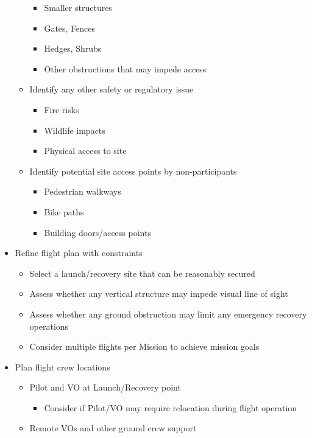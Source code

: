 \documentclass[
  12pt,
]{book}
\providecommand{\tightlist}{%
  \setlength{\itemsep}{0pt}\setlength{\parskip}{0pt}}
\begin{document}
\begin{itemize}
\begin{itemize}
    \begin{itemize}
    \tightlist
    \item
      Smaller structures
    \item
      Gates, Fences
    \item
      Hedges, Shrubs
    \item
      Other obstructions that may impede access
    \end{itemize}
  \item
    Identify any other safety or regulatory issue

    \begin{itemize}
    \tightlist
    \item
      Fire risks
    \item
      Wildlife impacts
    \item
      Physical access to site
    \end{itemize}
  \item
    Identify potential site access points by non-participants

    \begin{itemize}
    \tightlist
    \item
      Pedestrian walkways
    \item
      Bike paths
    \item
      Building doors/access points
    \end{itemize}
  \end{itemize}
\item
  Refine flight plan with constraints

  \begin{itemize}
  \tightlist
  \item
    Select a launch/recovery site that can be reasonably secured
  \item
    Assess whether any vertical structure may impede visual line of sight
  \item
    Assess whether any ground obstruction may limit any emergency recovery operations
  \item
    Consider multiple flights per Mission to achieve mission goals
  \end{itemize}
\item
  Plan flight crew locations

  \begin{itemize}
  \tightlist
  \item
    Pilot and VO at Launch/Recovery point

    \begin{itemize}
    \tightlist
    \item
      Consider if Pilot/VO may require relocation during flight operation
    \end{itemize}
  \item
    Remote VOs and other ground crew support


\end{itemize}
\end{itemize}
\end{document}
